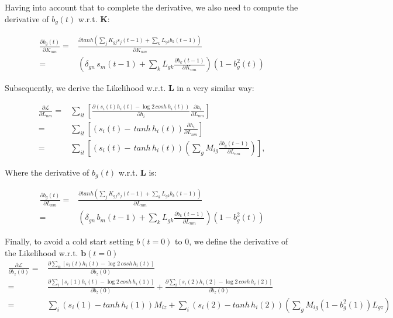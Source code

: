 \documentclass{article}
\def\*#1{\mathbf{#1}}
\begin{document}
Having into account that to complete the derivative, we also need to compute the derivative of $b_g(t)$ w.r.t. $\*K$:

\begin{align}
    \frac{\partial b_g(t)}{\partial K_{nm}} 
    =&  \frac{ \partial tanh {\left ( \sum_j K_{gj} s_j(t-1) + \sum_k L_{gk} b_k(t-1) \right )}}{\partial K_{nm}}
    \\ =& \left ( \delta_{gn} \, s_m(t-1) + \sum_k L_{gk} \frac{ \partial b_k(t-1)}{\partial K_{nm}} \right )
    \left ( 1 - b_g^2(t) \right )
\end{align}

Subsequently, we derive the Likelihood w.r.t. $\*L$ in a very similar way:

\begin{align}
    \frac{\partial\mathcal{L}}{\partial L_{nm}} =& 
    \sum_{it} \left [ \frac{ \partial \left ( s_{i}(t) h_{i}(t) - \log{ 2 \, cosh \, h_{i}(t)} \right )}{\partial h_i} \frac{\partial h_i}{\partial L_{nm}} \right ]
    \\ =& \sum_{it} \left [ \left ( s_{i}(t) -  \, tanh \, h_{i}(t) \right ) \frac{\partial h_i}{\partial L_{nm}} \right ]
    \\ =& \sum_{it} \left [ \left ( s_{i}(t) -  \, tanh \, h_{i}(t) \right ) \left ( \sum_g M_{ig} \frac{\partial  b_g(t-1)}{\partial L_{nm}} \right )  \right ],
\end{align}

Where the derivative of $b_g(t)$ w.r.t. $\*L$ is:

\begin{align}
    \frac{\partial b_g(t)}{\partial L_{nm}} 
    =&  \frac{ \partial tanh {\left ( \sum_j K_{gj} s_j(t-1) + \sum_k L_{gk} b_k(t-1) \right )}}{\partial L_{nm}}
    \\ =& \left ( \delta_{gn} \, b_m(t-1) + \sum_k  L_{gk} \frac{ \partial b_k(t-1)}{\partial L_{nm}}\right ) \left ( 1 - b_g^2(t) \right )
\end{align}

Finally, to avoid a cold start setting $b(t=0)$ to 0, we define the derivative of the Likelihood w.r.t. $\*b(t=0)$
\begin{align}
    \frac{\partial\mathcal{L}}{\partial b_{z}(0)} =& \frac{\partial \sum_{it} \left [ s_{i}(t) h_{i}(t) - \log{ 2 \, cosh \, h_{i}(t)} \right ]}{\partial b_{z}(0)}
    \\ = & \frac{\partial \sum_{i} \left [ s_{i}(1) h_{i}(t) - \log{ 2 \, cosh \, h_{i}(1)} \right ]}{\partial b_{z}(0)}
    + \frac{\partial \sum_{i} \left [ s_{i}(2) h_{i}(2) - \log{ 2 \, cosh \, h_{i}(2)} \right ]}{\partial b_{z}(0)}
     \\ =& \sum_{i}  \left ( s_{i}(1) - tanh \, h_{i}(1) \right )  M_{iz}
     + \sum_{i}  \left ( s_{i}(2) - tanh \, h_{i}(2) \right )  
     \left ( \sum_g M_{ig} (1 - b_g^2(1)) L_{gz
     } \right )
\end{align}
\end{document}
